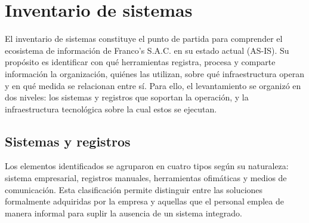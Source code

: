 \section{Inventario de sistemas}

El inventario de sistemas constituye el punto de partida para comprender el ecosistema de información de Franco's S.A.C. en su estado actual (AS-IS). Su propósito es identificar con qué herramientas registra, procesa y comparte información la organización, quiénes las utilizan, sobre qué infraestructura operan y en qué medida se relacionan entre sí. Para ello, el levantamiento se organizó en dos niveles: los sistemas y registros que soportan la operación, y la infraestructura tecnológica sobre la cual estos se ejecutan.

\subsection{Sistemas y registros}

Los elementos identificados se agruparon en cuatro tipos según su naturaleza: sistema empresarial, registros manuales, herramientas ofimáticas y medios de comunicación. Esta clasificación permite distinguir entre las soluciones formalmente adquiridas por la empresa y aquellas que el personal emplea de manera informal para suplir la ausencia de un sistema integrado.

